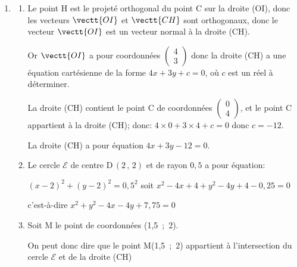 \begin{enumerate}
\begin{enumerate}
	\end{enumerate}
\item
	\begin{enumerate}
		\item 
Le point H est le projeté orthogonal du point C sur la droite (OI), donc les vecteurs $\vectt{OI}$ et $\vectt{CH}$ sont orthogonaux, donc le vecteur $\vectt{OI}$ est un vecteur normal à la droite (CH).

Or $\vectt{OI}$ a pour coordonnées $\begin{pmatrix} 4\\3 \end{pmatrix}$ donc la droite (CH) a une équation cartésienne de la forme $4x+3y+c=0$, où $c$ est un réel à déterminer.

La droite (CH) contient le point C de coordonnées $\begin{pmatrix} 0\\4 \end{pmatrix}$, et le point C appartient à la droite (CH); donc:
$4\times 0 + 3 \times 4 + c=0$ donc $c=-12$.

La droite (CH) a pour équation $4x+3y-12=0$.

		\item 
Le cercle $\mathcal{E}$ de centre D\,$(2\,,\,2)$ et de rayon $0,5$ a pour équation:

$(x-2)^2+(y-2)^2=0,5^2$ soit $x^2-4x+4+y^2-4y+4-0,25=0$

c'est-à-dire $x^2+y^2-4x-4y +7,75=0$

		\item Soit M le point de coordonnées (1,5~;~2).

	
On peut donc dire que le point M(1,5~;~2) appartient à l'intersection du cercle $\mathcal{E}$ et de la droite (CH)	

	\end{enumerate}


\end{enumerate}

\bigskip
